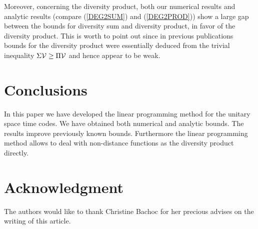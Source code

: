 \documentclass[10pt]{article}
\begin{document}
 Moreover, 
concerning the  diversity product, both our 
numerical results and analytic results (compare (\ref{DEG2SUM}) and (\ref{DEG2PROD})) show a large
 gap between the bounds for diversity sum and diversity product, in
 favor of the diversity product. This
 is worth to point out since in previous publications
 bounds for the diversity product were essentially  deduced from the
 trivial inequality $\Sigma \mathcal V \ge \Pi \mathcal V$ and hence appear to be
 weak. 


\section{Conclusions}

 In this paper we have developed  the linear programming method for
 the unitary space time codes. We have obtained both numerical and analytic bounds.
 The results improve previously known bounds. Furthermore the
 linear programming method allows to deal with
 non-distance functions as the diversity product directly.
 
\section*{Acknowledgment}
The authors would like to thank Christine Bachoc for her precious advises on the  writing of this article. 


 
\end{document}
